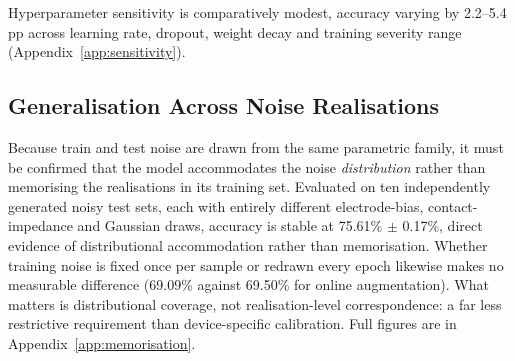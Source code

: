 Hyperparameter sensitivity is comparatively modest, accuracy varying by 2.2--5.4\,pp across learning rate, dropout, weight decay and training severity range (Appendix~\ref{app:sensitivity}).

\subsection{Generalisation Across Noise Realisations}
\label{sec:res-memorisation}

Because train and test noise are drawn from the same parametric family, it must be confirmed that the model accommodates the noise \emph{distribution} rather than memorising the realisations in its training set. Evaluated on ten independently generated noisy test sets, each with entirely different electrode-bias, contact-impedance and Gaussian draws, accuracy is stable at 75.61\% $\pm$ 0.17\%, direct evidence of distributional accommodation rather than memorisation. Whether training noise is fixed once per sample or redrawn every epoch likewise makes no measurable difference (69.09\% against 69.50\% for online augmentation). What matters is distributional coverage, not realisation-level correspondence: a far less restrictive requirement than device-specific calibration. Full figures are in Appendix~\ref{app:memorisation}.
